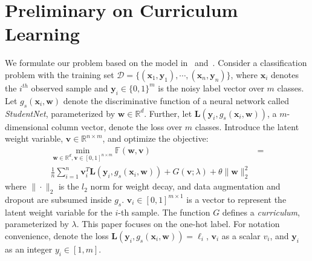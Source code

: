 \documentclass{article}
\begin{document}
\section{Preliminary on Curriculum Learning}
We formulate our problem based on the model in~\cite{kumar2010self} and~\cite{jiang2015self}. Consider a classification problem with the training set $\mathcal{D} = \{(\mathbf{x}_1,\mathbf{y}_1),\cdots, (\mathbf{x}_n,\mathbf{y}_n)\}$, where $\mathbf{x}_i$ denotes the $i^{th}$ observed sample and $\mathbf{y}_i \in \{0,1\}^m$ is the noisy label vector over $m$ classes. Let $g_{s}(\mathbf{x}_i,\mathbf{w})$ denote the discriminative function of a neural network called \emph{StudentNet}, parameterized by $\mathbf{w} \in \mathbb{R}^d$. Further, let $\mathbf{L}(\mathbf{y}_i,g_s(\mathbf{x}_i,\mathbf{w}))$, a $m$-dimensional column vector, denote the loss over $m$ classes. Introduce the latent weight variable, $\mathbf{v} \in \mathbb{R}^{n \times m}$, and optimize the objective:
\begin{align}
\label{eq:datareg_obj}
\min_{\mathbf{w}  \in \mathbb{R}^d ,\mathbf{v}\in [0,\!1]^{n \times m}}\!\!\mathbb{F}(\mathbf{w},\!\mathbf{v})
&= \nonumber\\[-1.0ex]
\frac{1}{n}\sum_{i=1}^n \mathbf{v}_i^T \mathbf{L}(\mathbf{y}_i,\!g_s(\mathbf{x}_i,\!\mathbf{w})) + G(\mathbf{v}; \lambda) + \theta \|\mathbf{w}\|_2^2
\end{align}
where $\|\cdot\|_2$ is the $l_2$ norm for weight decay, and data augmentation and dropout are subsumed inside $g_s$. $\mathbf{v}_i \in [0,1]^{m \times 1}$ is a vector to represent the latent weight variable for the $i$-th sample. The function $G$ defines a \emph{curriculum}, parameterized by $\lambda$. This paper focuses on the one-hot label. For notation convenience, denote the loss $\mathbf{L}(\mathbf{y}_i,\!g_s(\mathbf{x}_i,\!\mathbf{w}))\!=\!\ell_i$, $\mathbf{v}_i$ as a scalar $v_i$, and $\mathbf{y}_i$ as an integer $y_i \in [1,m]$. 
\end{document}
